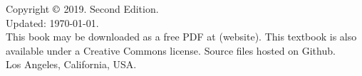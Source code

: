	\null \vfill
	\noindent%
		Copyright $\copyright$ 2019. Second Edition. \\
		Updated: \today. \\
	\noindent%
		This book may be downloaded as a free PDF at (website).
		This textbook is also available under a Creative Commons license.
		Source files hosted on {Github}. \\

	\noindent Los Angeles, California, USA.
	\clearpage
